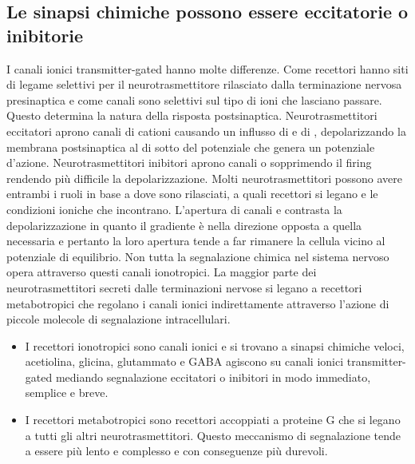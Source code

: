\subsection{Le sinapsi chimiche possono essere eccitatorie o inibitorie}
I canali ionici transmitter-gated hanno molte differenze. Come recettori hanno siti di legame selettivi per il neurotrasmettitore rilasciato dalla terminazione nervosa presinaptica e
come canali sono selettivi sul tipo di ioni che lasciano passare. Questo determina la natura della risposta postsinaptica. Neurotrasmettitori eccitatori aprono canali di cationi causando
un influsso di  e di , depolarizzando la membrana postsinaptica al di sotto del potenziale che genera un potenziale d'azione. Neurotrasmettitori inibitori aprono
canali  o  sopprimendo il firing rendendo pi\`u difficile la depolarizzazione. Molti neurotrasmettitori possono avere entrambi i ruoli in base a dove sono rilasciati, a
quali recettori si legano e le condizioni ioniche che incontrano. L'apertura di canali  e  contrasta la depolarizzazione in quanto il gradiente \`e nella direzione opposta
a quella necessaria e pertanto la loro apertura tende a far rimanere la cellula vicino al potenziale di equilibrio. Non tutta la segnalazione chimica nel sistema nervoso opera attraverso
questi canali ionotropici. La maggior parte dei neurotrasmettitori secreti dalle terminazioni nervose si legano a recettori metabotropici che regolano i canali ionici indirettamente
attraverso l'azione di piccole molecole di segnalazione intracellulari.
\begin{itemize}
	\item I recettori ionotropici sono canali ionici e si trovano a sinapsi chimiche veloci, acetiolina, glicina, glutammato e GABA agiscono su canali ionici transmitter-gated 
		mediando segnalazione eccitatori o inibitori in modo immediato, semplice e breve.
	\item I recettori metabotropici sono recettori accoppiati a proteine G che si legano a tutti gli altri neurotrasmettitori. Questo meccanismo di segnalazione tende a essere 
		pi\`u lento e complesso e con conseguenze pi\`u durevoli.
\end{itemize}
